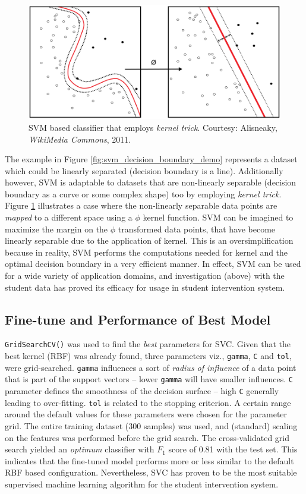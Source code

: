 \documentclass{article}
\begin{document}
	\begin{figure}[h]
		\centering
		\includegraphics[scale=0.5]{svm_kernel_trick}
		\caption{SVM based classifier that employs \emph{kernel trick}. Courtesy: Alisneaky, \emph{WikiMedia Commons}, 2011.}
		\label{fig:kernel_trick}
	\end{figure}
	
	The example in Figure \ref{fig:svm_decision_boundary_demo} represents a dataset which could be linearly separated (decision boundary is a line). Additionally however, SVM is adaptable to datasets that are non-linearly separable (decision boundary as a curve or some complex shape) too by employing \emph{kernel trick}. Figure \ref{fig:kernel_trick} illustrates a case where the non-linearly separable data points are \emph{mapped} to a different space using a $\phi$ kernel function. SVM can be imagined to maximize the margin on the $\phi$ transformed data points, that have become linearly separable due to the application of kernel. This is an oversimplification because in reality, SVM performs the computations needed for kernel and the optimal decision boundary in a very efficient manner. In effect, SVM can be used for a wide variety of application domains, and investigation (above) with the student data has proved its efficacy for usage in student intervention system.
	
	\subsection{Fine-tune and Performance of Best Model}
	\texttt{GridSearchCV()} was used to find the \emph{best} parameters for SVC. Given that the best kernel (RBF) was already found, three parameters viz., \texttt{gamma}, \texttt{C} and \texttt{tol}, were grid-searched. \texttt{gamma} influences a sort of \emph{radius of influence} of a data point that is part of the support vectors -- lower \texttt{gamma} will have smaller influences. \texttt{C} parameter defines the smoothness of the decision surface -- high \texttt{C} generally leading to over-fitting. \texttt{tol} is related to the stopping criterion. A certain range around the default values for these parameters were chosen for the parameter grid. The entire training dataset (300 samples) was used, and (standard) scaling on the features was performed before the grid search. The cross-validated grid search yielded an \emph{optimum} classifier with $F_1$ score of 0.81 with the test set. This indicates that the fine-tuned model performs more or less similar to the default RBF based configuration. Nevertheless, SVC has proven to be the most suitable supervised machine learning algorithm for the student intervention system.
	
\end{document}
